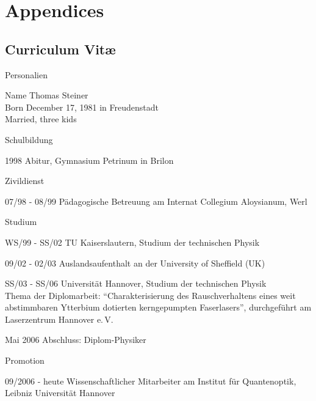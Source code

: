 

\chapter{Appendices}
\appendix

\ifpdf
    \graphicspath{{backmatter/figures/PNG/}{backmatter/figures/PDF/}{backmatter/figures/}}
\else
    \graphicspath{{backmatter/figures/EPS/}{backmatter/figures/}}
\fi


\section*{Curriculum Vit{\ae}}

\begin{cv}{}
\begin{cvlist}{Personalien}
	\item[Name]
		Thomas Steiner \\
		Born December 17, 1981 in Freudenstadt\\
		Married, three kids
\end{cvlist}
%
\begin{cvlist}{Schulbildung}
	\item[1998] Abitur, Gymnasium Petrinum in Brilon 
\end{cvlist}
%
\begin{cvlist}{Zivildienst}
	\item[07/98 - 08/99] 
	Pädagogische Betreuung am Internat Collegium Aloysianum, Werl
\end{cvlist}
%
\begin{cvlist}{Studium}
	\item[WS/99 - SS/02] TU Kaiserslautern, Studium der technischen Physik
	\item[09/02 - 02/03] Auslandsaufenthalt an der University of Sheffield (UK)
	\item[SS/03 - SS/06] Universität Hannover, Studium der technischen Physik
	\\[0.5\baselineskip]
Thema der Diplomarbeit: \enquote{Charakterisierung des Rauschverhaltens eines 
weit abstimmbaren Ytterbium dotierten kerngepumpten Faserlasers}, durchgeführt 
am Laserzentrum Hannover e.\,V.
	\item[Mai 2006] Abschluss: Diplom-Physiker	
\end{cvlist}
%
\begin{cvlist}{Promotion}
	\item[09/2006 - heute] Wissenschaftlicher Mitarbeiter am Institut für 
Quantenoptik, Leibniz Universität Hannover
\end{cvlist}
\end{cv}

